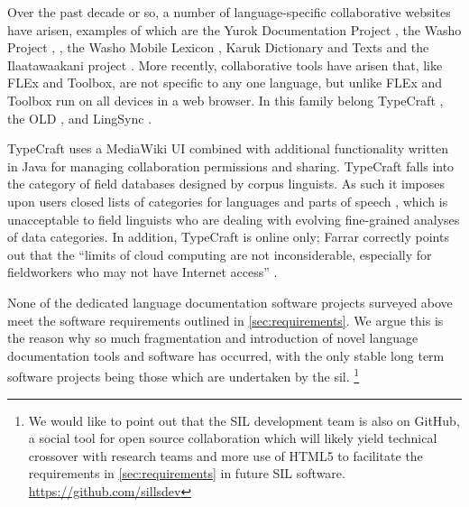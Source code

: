 \documentclass[11pt]{article}
\newcommand{\smalltodo}[2][]
    {\todo[caption={#2}, #1]
    {\tiny#2\normalsize}}
\begin{document}
% 


Over the past decade or so, a number of language-specific collaborative 
websites have arisen, examples of which are  
the Yurok Documentation Project \cite{Yurok:2001:Online},
the Washo Project \cite{Washo:2005:Online}, \cite{Cihlar:2008}, the Washo
Mobile Lexicon \cite{WashoMobile:2008:Online}, Karuk Dictionary and Texts
\cite{Karuk:2009:Online} and the Ilaatawaakani project \cite{Troy:2014}.
More recently, collaborative  tools have arisen that, like FLEx and Toolbox,
are not specific to any one language, but unlike FLEx and Toolbox run on all devices in a web
browser.  In this family belong TypeCraft \cite{Beermann:2012}, the OLD
\cite{dunham2014docs}, and LingSync \cite{lingsync:2012}.

TypeCraft uses a MediaWiki UI combined with additional functionality written in
Java for managing collaboration permissions and sharing. TypeCraft falls into
the category of field databases designed by corpus linguists. As such it
imposes upon users closed lists of categories for languages and parts of speech
\cite{Farrar:2010}, which is unacceptable to field linguists who are
dealing with evolving fine-grained analyses of data categories. In addition,
TypeCraft is online only; Farrar correctly points out that the ``limits of cloud computing
are not inconsiderable, especially for fieldworkers who may not have Internet
access'' \cite{Farrar:2010}.%

None of the dedicated language documentation software projects surveyed above 
meet the software requirements outlined in \autoref{sec:requirements}. 
We argue this is the reason why so much fragmentation and introduction of novel language documentation tools and software has occurred, with the only stable long term software projects being those which are undertaken by the \gls{sil}.%
\footnote{We would like to point out that the SIL development team is also on GitHub,  a social tool for open source collaboration which will likely yield technical crossover with research teams and more use of HTML5 to facilitate the requirements in \autoref{sec:requirements} in future SIL software. \url{https://github.com/sillsdev}}
%
\end{document}
